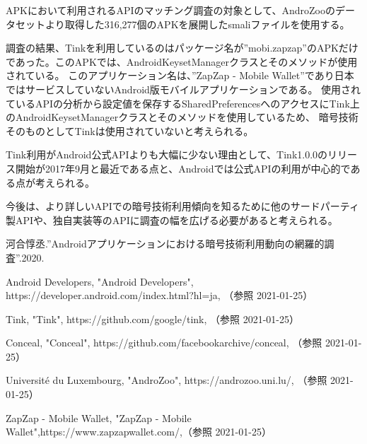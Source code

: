 \documentclass[twocolumn, 10pt, a4paper]{jarticle}
\begin{document}
APKにおいて利用されるAPIのマッチング調査の対象として、AndroZoo\cite{AndroZoo}のデータセットより取得した316,277個のAPKを展開したsmaliファイルを使用する。

調査の結果、Tinkを利用しているのはパッケージ名が''mobi.zapzap''のAPKだけであった。このAPKでは、AndroidKeysetManagerクラスとそのメソッドが使用されている。
このアプリケーション名は、''ZapZap - Mobile Wallet''\cite{ZapZap}であり日本ではサービスしていないAndroid版モバイルアプリケーションである。
使用されているAPIの分析から設定値を保存するSharedPreferencesへのアクセスにTink上のAndroidKeysetManagerクラスとそのメソッドを使用しているため、
暗号技術そのものとしてTinkは使用されていないと考えられる。

Tink利用がAndroid公式APIよりも大幅に少ない理由として、Tink1.0.0のリリース開始が2017年9月と最近である点と、Androidでは公式APIの利用が中心的である点が考えられる。

今後は、より詳しいAPIでの暗号技術利用傾向を知るために他のサードパーティ製APIや、独自実装等のAPIに調査の幅を広げる必要があると考えられる。



\begin{thebibliography}{10}

河合惇丞.''Androidアプリケーションにおける暗号技術利用動向の網羅的調査''.2020.

Android Developers, "Android Developers", https://developer.android.com/index.html?hl=ja, （参照 2021-01-25）

Tink, "Tink", https://github.com/google/tink, （参照 2021-01-25）

Conceal, "Conceal", https://github.com/facebookarchive/conceal, （参照 2021-01-25）

Université du Luxembourg, "AndroZoo",  https://androzoo.uni.lu/, （参照 2021-01-25）

ZapZap - Mobile Wallet, "ZapZap - Mobile Wallet",https://www.zapzapwallet.com/,（参照 2021-01-25）
\end{thebibliography}
\end{document}
